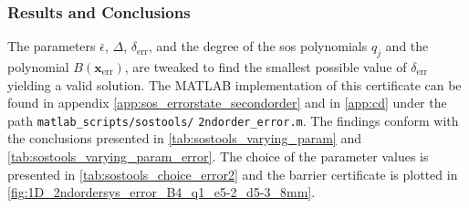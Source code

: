 
\subsubsection{Results and Conclusions}

\vspace{-2mm}
The parameters $\bar{\epsilon}$, $\Delta$, $\delta_\text{err}$, and the degree of the \gls{sos} polynomials $q_j$ and the polynomial $B(\mathbf{x}_\text{err})$, are tweaked to find the smallest possible value of $\delta_\text{err}$ yielding a valid solution.
The MATLAB implementation of this certificate can be found in appendix \ref{app:sos_errorstate_secondorder} and in \autoref{app:cd} under the path \texttt{matlab\_scripts/}\texttt{sostools/} \texttt{2ndorder\_error.m}.
The findings conform with the conclusions presented in \autoref{tab:sostools_varying_param} and \autoref{tab:sostools_varying_param_error}. The choice of the parameter values is presented in \autoref{tab:sostools_choice_error2} and the  barrier certificate is plotted in \autoref{fig:1D_2ndordersys_error_B4_q1_e5-2_d5-3_8mm}.


